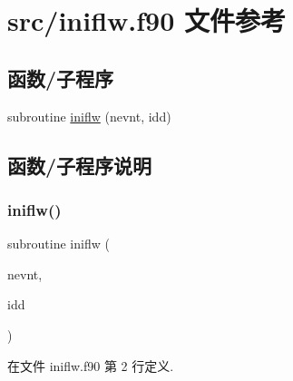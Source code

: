 \hypertarget{iniflw_8f90}{}\section{src/iniflw.f90 文件参考}
\label{iniflw_8f90}
\subsection*{函数/子程序}
\begin{DoxyCompactItemize}
\item 
subroutine \mbox{\hyperlink{iniflw_8f90_a4a3690998142f1953adeb88fe61b1d2f}{iniflw}} (nevnt, idd)
\end{DoxyCompactItemize}


\subsection{函数/子程序说明}
\mbox{\label{iniflw_8f90_a4a3690998142f1953adeb88fe61b1d2f}} 
\subsubsection{\texorpdfstring{iniflw()}{iniflw()}}
{\footnotesize\ttfamily subroutine iniflw (\begin{DoxyParamCaption}\item[{}]{nevnt,  }\item[{}]{idd }\end{DoxyParamCaption})}



在文件 iniflw.\+f90 第 2 行定义.

